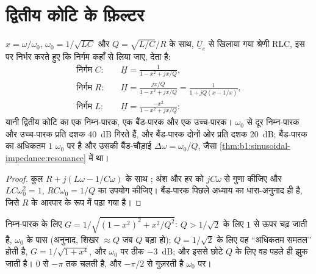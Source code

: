 \section{द्वितीय कोटि के फ़िल्टर}

\begin{proposition}[तीन फ़िल्टरों के रूप में श्रेणी RLC]\label{prop:b1:filters-transfer-functions:rlc}
$x = \omega/\omega_0$, $\omega_0 = 1/\sqrt{LC}$ और $Q =
\sqrt{L/C}/R$ के साथ, $\underline U_e$ से खिलाया गया श्रेणी RLC, इस पर
निर्भर करते हुए कि निर्गम कहाँ से लिया जाए, देता है:
\begin{align*}
\text{निर्गम } C:&\quad \underline H = \frac{1}{1 - x^2 + jx/Q}, \\
\text{निर्गम } R:&\quad \underline H = \frac{jx/Q}{1 - x^2 + jx/Q} = \frac{1}{1 + jQ(x - 1/x)}, \\
\text{निर्गम } L:&\quad \underline H = \frac{-x^2}{1 - x^2 + jx/Q}:
\end{align*}
यानी द्वितीय कोटि का एक निम्न-पारक, एक बैंड-पारक और एक उच्च-पारक।
$\omega_0$ से दूर निम्न-पारक और उच्च-पारक प्रति दशक \qty{40}{dB} गिरते हैं,
और बैंड-पारक दोनों ओर प्रति दशक \qty{20}{dB}; बैंड-पारक
का अधिकतम $1$ $\omega_0$ पर है और उसकी बैंड-चौड़ाई $\Delta\omega =
\omega_0/Q$, जैसा \cref{thm:b1:sinusoidal-impedance:resonance} में था।
\end{proposition}

\begin{proof}
कुल  $R + j(L\omega - 1/C\omega)$ के साथ ;
अंश और हर को $jC\omega$ से गुणा कीजिए और
$LC\omega_0^2 = 1$, $RC\omega_0 = 1/Q$ का उपयोग कीजिए। बैंड-पारक पिछले अध्याय
का धारा-अनुनाद ही है, जिसे $R$ के आरपार  के रूप में पढ़ा गया है।
\end{proof}

\begin{proposition}[द्वितीय कोटि का निम्न-पारक: $Q$ की भूमिका]\label{prop:b1:filters-transfer-functions:lowpass2}
निम्न-पारक के लिए $G = 1/\sqrt{(1 - x^2)^2 + x^2/Q^2}$:
$Q > 1/\sqrt2$ के लिए  $1$ से ऊपर चढ़ जाती है, $\omega_0$ के पास (अनुनाद,
शिखर $\approx Q$ जब $Q$ बड़ा हो); $Q = 1/\sqrt2$ के लिए वह ``अधिकतम समतल''
होती है, $G = 1/\sqrt{1 + x^4}$, और $\omega_0$ पर ठीक \qty{-3}{dB}; और इससे
छोटे $Q$ के लिए वह पहले ही झुक जाती है।  $0$ से $-\pi$ तक चलती है, और
$-\pi/2$ से गुज़रती है $\omega_0$ पर।
\end{proposition}

